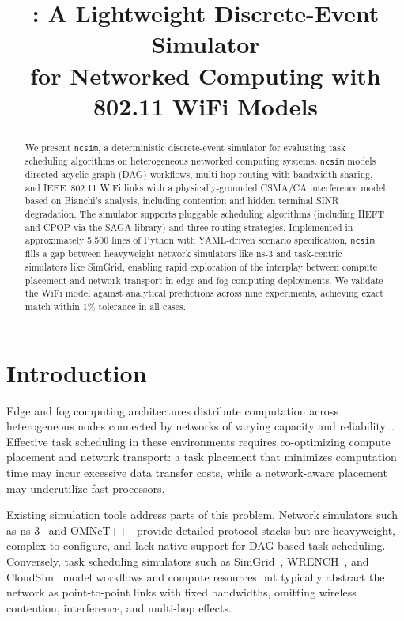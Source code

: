 \documentclass[conference]{IEEEtran}
\title{\ncsim{}: A Lightweight Discrete-Event Simulator\\for Networked Computing with 802.11 WiFi Models}
\author{
\IEEEauthorblockN{Bhaskar Krishnamachari\IEEEauthorrefmark{1},
Maya Gutierrez\IEEEauthorrefmark{1}, and
Jared Coleman\IEEEauthorrefmark{1}\IEEEauthorrefmark{2}}
\IEEEauthorblockA{\IEEEauthorrefmark{1}University of Southern California\\
bkrishna@usc.edu, mayaguti@usc.edu}
\IEEEauthorblockA{\IEEEauthorrefmark{2}Loyola Marymount University\\
jared.coleman@lmu.edu}
}
\newcommand{\ncsim}{\texttt{ncsim}}
\begin{document}
\maketitle

\begin{abstract}
We present \ncsim{}, a deterministic discrete-event simulator for evaluating
task scheduling algorithms on heterogeneous networked computing systems.
\ncsim{} models directed acyclic graph (DAG) workflows, multi-hop routing
with bandwidth sharing, and IEEE~802.11 WiFi links with a
physically-grounded CSMA/CA interference model based on Bianchi's analysis,
including contention and hidden terminal SINR degradation.
The simulator supports pluggable scheduling
algorithms (including HEFT and CPOP via the SAGA library) and three routing
strategies.
Implemented in approximately 5,500 lines of Python with YAML-driven scenario
specification, \ncsim{} fills a gap between heavyweight network simulators
like ns-3 and task-centric simulators like SimGrid, enabling rapid
exploration of the interplay between compute placement and network transport
in edge and fog computing deployments.  We validate the WiFi model against
analytical predictions across nine experiments, achieving exact match within
1\% tolerance in all cases.
\end{abstract}

\section{Introduction}
\label{sec:intro}

Edge and fog computing architectures distribute computation across
heterogeneous nodes connected by networks of varying capacity and
reliability~\cite{shi2016edge}.  Effective task scheduling in these
environments requires co-optimizing compute placement and network transport:
a task placement that minimizes computation time may incur excessive data
transfer costs, while a network-aware placement may underutilize fast
processors.

Existing simulation tools address parts of this problem.  Network simulators
such as ns-3~\cite{ns3} and OMNeT++~\cite{omnetpp} provide detailed protocol
stacks but are heavyweight, complex to configure, and lack native support for
DAG-based task scheduling.  Conversely, task scheduling simulators such as
SimGrid~\cite{simgrid}, WRENCH~\cite{wrench}, and CloudSim~\cite{cloudsim}
model workflows and compute resources but typically abstract the network as
point-to-point links with fixed bandwidths, omitting wireless contention,
interference, and multi-hop effects.
\end{document}
